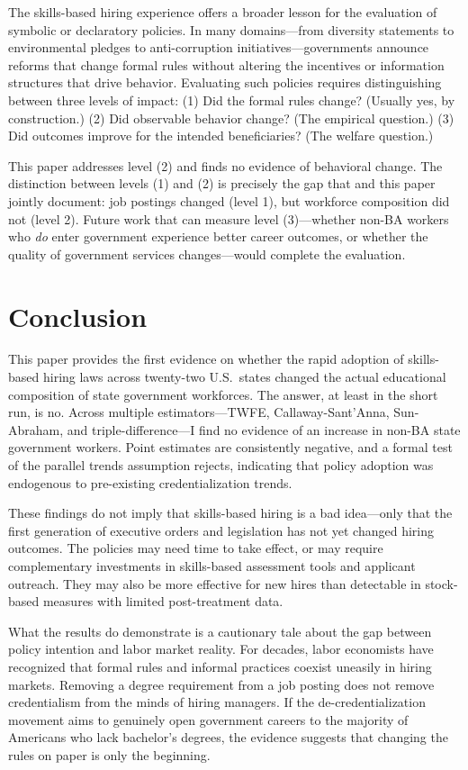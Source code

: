 \documentclass[12pt]{article}
\begin{document}
The skills-based hiring experience offers a broader lesson for the evaluation of symbolic or declaratory policies. In many domains---from diversity statements to environmental pledges to anti-corruption initiatives---governments announce reforms that change formal rules without altering the incentives or information structures that drive behavior. Evaluating such policies requires distinguishing between three levels of impact: (1) Did the formal rules change? (Usually yes, by construction.) (2) Did observable behavior change? (The empirical question.) (3) Did outcomes improve for the intended beneficiaries? (The welfare question.)

This paper addresses level (2) and finds no evidence of behavioral change. The distinction between levels (1) and (2) is precisely the gap that \citet{Blair2024} and this paper jointly document: job postings changed (level 1), but workforce composition did not (level 2). Future work that can measure level (3)---whether non-BA workers who \emph{do} enter government experience better career outcomes, or whether the quality of government services changes---would complete the evaluation.


\section{Conclusion} \label{sec:conclusion}

This paper provides the first evidence on whether the rapid adoption of skills-based hiring laws across twenty-two U.S.\ states changed the actual educational composition of state government workforces. The answer, at least in the short run, is no. Across multiple estimators---TWFE, Callaway-Sant'Anna, Sun-Abraham, and triple-difference---I find no evidence of an increase in non-BA state government workers. Point estimates are consistently negative, and a formal test of the parallel trends assumption rejects, indicating that policy adoption was endogenous to pre-existing credentialization trends.

These findings do not imply that skills-based hiring is a bad idea---only that the first generation of executive orders and legislation has not yet changed hiring outcomes. The policies may need time to take effect, or may require complementary investments in skills-based assessment tools and applicant outreach. They may also be more effective for new hires than detectable in stock-based measures with limited post-treatment data.

What the results do demonstrate is a cautionary tale about the gap between policy intention and labor market reality. For decades, labor economists have recognized that formal rules and informal practices coexist uneasily in hiring markets. Removing a degree requirement from a job posting does not remove credentialism from the minds of hiring managers. If the de-credentialization movement aims to genuinely open government careers to the majority of Americans who lack bachelor's degrees, the evidence suggests that changing the rules on paper is only the beginning.
\end{document}
